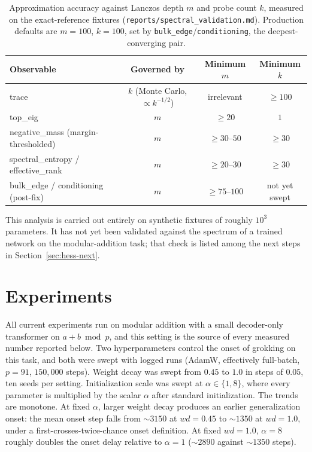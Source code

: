 \documentclass[11pt,a4paper]{article}
\begin{document}
\begin{table}[htbp]
\centering
\small
\begin{tabular}{lccc}
\toprule
Observable & Governed by & Minimum $m$ & Minimum $k$ \\
\midrule
trace & $k$ (Monte Carlo, $\propto k^{-1/2}$) & irrelevant & $\ge 100$ \\
top\_eig & $m$ & $\ge 20$ & $1$ \\
negative\_mass (margin-thresholded) & $m$ & $\ge 30$--$50$ & $\ge 30$ \\
spectral\_entropy / effective\_rank & $m$ & $\ge 20$--$30$ & $\ge 30$ \\
bulk\_edge / conditioning (post-fix) & $m$ & $\ge 75$--$100$ & not yet swept \\
\bottomrule
\end{tabular}
\caption{Approximation accuracy against Lanczos depth $m$ and probe count $k$,
measured on the exact-reference fixtures
(\texttt{reports/spectral\_validation.md}). Production defaults are $m=100$,
$k=100$, set by \texttt{bulk\_edge}/\texttt{conditioning}, the deepest-converging
pair.}
\label{tab:hess-mk}
\end{table}

This analysis is carried out entirely on synthetic fixtures of roughly $10^3$
parameters. It has not yet been validated against the spectrum of a trained
network on the modular-addition task; that check is listed among the next steps
in Section~\ref{sec:hess-next}.

\section{Experiments}
\label{sec:hess-experiments}

All current experiments run on modular addition with a small decoder-only
transformer on $a+b \bmod p$, and this setting is the source of every measured
number reported below. Two hyperparameters control the onset of grokking on this
task, and both were
swept with logged runs (AdamW, effectively full-batch, $p=91$, $150{,}000$
steps). Weight decay was swept from $0.45$ to $1.0$ in steps of $0.05$, ten
seeds per setting. Initialization scale was swept at $\alpha \in \{1,8\}$, where
every parameter is multiplied by the scalar $\alpha$ after standard
initialization. The trends are monotone. At fixed $\alpha$, larger weight decay
produces an earlier generalization onset: the mean onset step falls from
$\sim\!3150$ at $wd=0.45$ to $\sim\!1350$ at $wd=1.0$, under a
first-crosses-twice-chance onset definition. At fixed $wd=1.0$, $\alpha=8$
roughly doubles the onset delay relative to $\alpha=1$ ($\sim\!2890$ against
$\sim\!1350$ steps).
\end{document}
